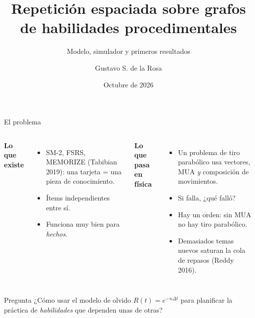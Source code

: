 \documentclass[aspectratio=169,11pt]{beamer}
\title{Repetición espaciada sobre grafos de habilidades procedimentales}
\subtitle{Modelo, simulador y primeros resultados}
\author{Gustavo S. de la Rosa}
\institute{Proyecto de maestría --- reunión con el asesor}
\date{Octubre de 2026}
\begin{document}
\maketitle

\begin{frame}{El problema}
\small
\begin{columns}[T]
\textbf{Lo que existe}
\begin{itemize}
\item SM-2, FSRS, MEMORIZE (Tabibian 2019): una tarjeta = \alert{una} pieza de conocimiento.
\item Ítems independientes entre sí.
\item Funciona muy bien para \emph{hechos}.
\end{itemize}
\textbf{Lo que pasa en física}
\begin{itemize}
\item Un problema de tiro parabólico usa vectores, MUA \emph{y} composición de movimientos.
\item Si falla, ¿\alert{qué} falló?
\item Hay un orden: sin MUA no hay tiro parabólico.
\item Demasiados temas nuevos saturan la cola de repasos (Reddy 2016).
\end{itemize}
\end{columns}
\vspace{2mm}
\begin{block}{Pregunta}
¿Cómo usar el modelo de olvido $R(t)=e^{-n\Delta t}$ para planificar la práctica de \emph{habilidades} que dependen unas de otras?
\end{block}
\end{frame}
\end{document}

